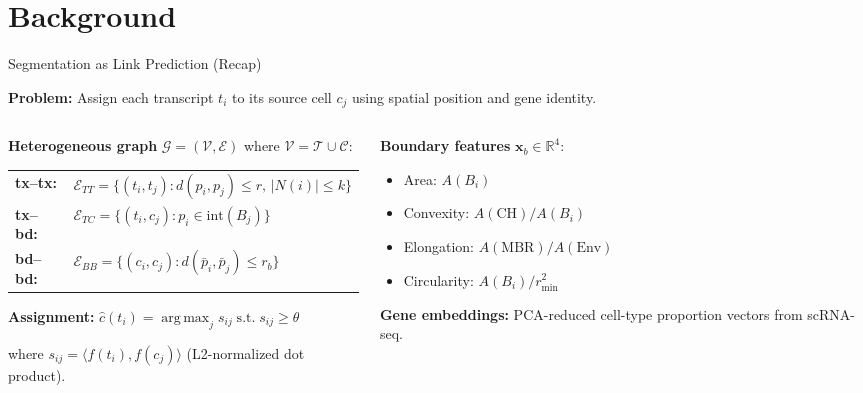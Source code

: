 \documentclass[aspectratio=169,10pt]{beamer}
\newcommand{\vect}[1]{\boldsymbol{#1}}
\newcommand{\graph}{\mathcal{G}}
\newcommand{\vertices}{\mathcal{V}}
\newcommand{\edges}{\mathcal{E}}
\newcommand{\Tcal}{\mathcal{T}}
\newcommand{\Ccal}{\mathcal{C}}
\newcommand{\Real}{\mathbb{R}}
\newcommand{\inner}[2]{\langle #1, #2 \rangle}
\DeclareMathOperator*{\argmax}{arg\,max}
\begin{document}
\section{Background}

\begin{frame}{Segmentation as Link Prediction (Recap)}

\textbf{Problem:} Assign each transcript $t_i$ to its source cell $c_j$ using spatial position and gene identity.

\vspace{0.15cm}

\begin{columns}[T]
\begin{column}{0.52\textwidth}
\textbf{Heterogeneous graph} $\graph = (\vertices, \edges)$ where $\vertices = \Tcal \cup \Ccal$:

\vspace{0.1cm}
{\small
\begin{tabular}{@{}ll@{}}
\textbf{tx--tx:} & $\edges_{TT} = \{(t_i, t_j) : d(p_i, p_j) \leq r,\, |N(i)| \leq k\}$ \\[3pt]
\textbf{tx--bd:} & $\edges_{TC} = \{(t_i, c_j) : p_i \in \text{int}(B_j)\}$ \\[3pt]
\textbf{bd--bd:} & $\edges_{BB} = \{(c_i, c_j) : d(\bar{p}_i, \bar{p}_j) \leq r_b\}$ \\
\end{tabular}
}

\vspace{0.15cm}
\textbf{Assignment:}
\(
  \hat{c}(t_i) = \argmax_j s_{ij} \;\text{s.t.}\; s_{ij} \geq \theta
\)

where $s_{ij} = \inner{f(t_i)}{f(c_j)}$ (L2-normalized dot product).
\end{column}

\begin{column}{0.44\textwidth}
\textbf{Boundary features} $\vect{x}_b \in \Real^{4}$:
{\small
\begin{itemize}\setlength\itemsep{2pt}
  \item Area: $A(B_i)$
  \item Convexity: $A(\text{CH})/A(B_i)$
  \item Elongation: $A(\text{MBR})/A(\text{Env})$
  \item Circularity: $A(B_i)/r_{\min}^2$
\end{itemize}
}

\vspace{0.1cm}
\textbf{Gene embeddings:} PCA-reduced cell-type proportion vectors from scRNA-seq.
\end{column}
\end{columns}
\end{frame}
\end{document}
